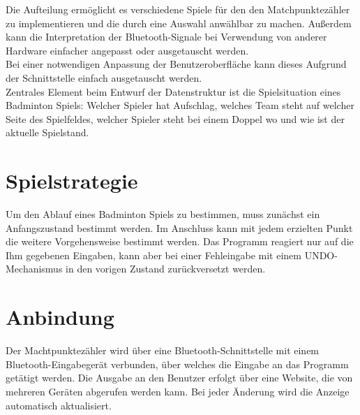 Die Aufteilung ermöglicht es verschiedene Spiele für den den Matchpunktezähler zu implementieren und die durch eine Auswahl anwählbar zu machen. Außerdem kann die Interpretation der Bluetooth-Signale bei Verwendung von anderer Hardware einfacher angepasst oder ausgetauscht werden.\\
Bei einer notwendigen Anpassung der Benutzeroberfläche kann dieses Aufgrund der Schnittstelle einfach ausgetauscht werden.\\[0.4cm]

Zentrales Element beim Entwurf der Datenstruktur ist die Spielsituation eines Badminton Spiels: Welcher Spieler hat Aufschlag, welches Team steht auf welcher Seite des Spielfeldes, welcher Spieler steht bei einem Doppel wo und wie ist der aktuelle Spielstand.
\section{Spielstrategie}
Um den Ablauf eines Badminton Spiels zu bestimmen, muss zunächst ein Anfangszustand bestimmt werden. Im Anschluss kann mit jedem erzielten Punkt die weitere Vorgehensweise bestimmt werden. Das Programm reagiert nur auf die Ihm gegebenen Eingaben, kann aber bei einer Fehleingabe mit einem UNDO-Mechanismus in den vorigen Zustand zurückversetzt werden.
\section{Anbindung}
Der Machtpunktezähler wird über eine Bluetooth-Schnittstelle mit einem Bluetooth-Eingabegerät verbunden, über welches die Eingabe an das Programm getätigt werden. Die Ausgabe an den Benutzer erfolgt über eine Website, die von mehreren Geräten abgerufen werden kann. Bei jeder Änderung wird die Anzeige automatisch aktualisiert.